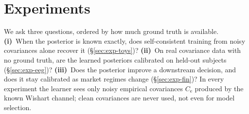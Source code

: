 \providecommand{\scsi}{\textsc{SC-SI}}
\providecommand{\Ce}{C_{\mathrm{e}}}

\section{Experiments}
\label{sec:experiments}

We ask three questions, ordered by how much ground truth is available.
\textbf{(i)}~When the posterior is known exactly, does self-consistent training from noisy covariances alone recover it (\S\ref{sec:exp-toys})?
\textbf{(ii)}~On real covariance data with no ground truth, are the learned posteriors calibrated on held-out subjects (\S\ref{sec:exp-eeg})?
\textbf{(iii)}~Does the posterior improve a downstream decision, and does it stay calibrated as market regimes change (\S\ref{sec:exp-fin})?
In every experiment the learner sees only noisy empirical covariances $\Ce$ produced by the known Wishart channel; clean covariances are never used, not even for model selection.

